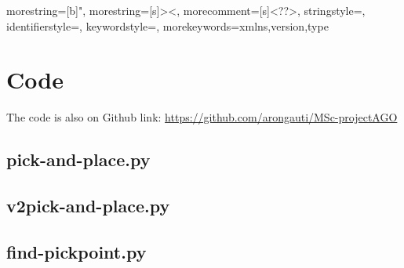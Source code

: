 


{
  morestring=[b]",
  morestring=[s]{>}{<},
  morecomment=[s]{<?}{?>},
  stringstyle=\color{black},
  identifierstyle=\color{darkblue},
  keywordstyle=\color{cyan},
  morekeywords={xmlns,version,type}%
}
\appendix



\chapter{Code}  \label{app:code}
The code is also on Github link: \url{https://github.com/arongauti/MSc-projectAGO}
\section{pick-and-place.py}\label{sec:pickandplace}

\pagebreak

\section{v2pick-and-place.py}\label{sec:v2pickandplace}

\pagebreak

\section{find-pickpoint.py}\label{sec:findpickpoint}

\pagebreak

